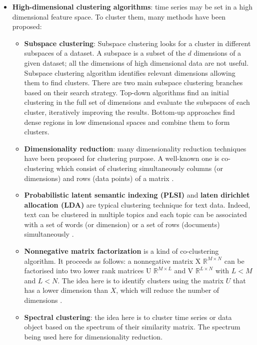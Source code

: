 \begin{itemize}
\item  \textbf{High-dimensional clustering algorithms}: time series may be set in a high dimensional feature space. To cluster them, many methods have been proposed:

\begin{itemize}
	\item  \textbf{Subspace clustering}: Subspace clustering looks for a cluster in 	different subspaces of a dataset.  A subspace is a subset of the $d$ dimensions 		of a given dataset; all the dimensions of high dimensional data are not useful. 	Subspace clustering algorithm identifies relevant dimensions allowing them to 		find clusters. There are two main subspace clustering branches based on their 		search strategy. Top-down algorithms find an initial clustering in the full set 		of dimensions and evaluate the subspaces of each cluster, iteratively improving 	the results. Bottom-up approaches find dense regions in low dimensional spaces 		and combine them to form clusters\cite{parsons2004subspace}.
	\item \textbf{Dimensionality reduction}: many dimensionality reduction 				techniques have been proposed for clustering purpose. A well-known one is co-clustering which consist of clustering simultaneously columns (or dimensions) 	and	rows (data points) of a matrix \cite{dhillon2003information}.
	\item \textbf{Probabilistic latent semantic indexing (PLSI)} and \textbf{laten 		dirichlet allocation (LDA)}  are typical clustering technique for text data. Indeed, text can be clustered in multiple topics and  each topic can be associated with a 		set of words (or dimension) or a set of rows (documents) simultaneously 			\cite{hofmann2017probabilistic}.
	\item \textbf{Nonnegative matrix factorization} is a kind of co-clustering 			algorithm. It proceeds as follows: a nonnegative matrix X \in $\mathbb{R}^{M			\times N}$ can be 			factorised into two lower rank matrices U \in $			\mathbb{R}^{M\times L}$ and V \in $\mathbb{R}^{L\times N}$ with $L < M$ and $L 		< N$.  The idea here is to identify clusters using the matrix $U$ that has a lower 	dimension than $X$, which will reduce the number of dimensions 						\cite{wang2013nonnegative}.
	\item \textbf{Spectral clustering}: the idea here is to cluster time series or 		data object based on the spectrum of their similarity matrix. The spectrum 			being used here for dimensionality reduction\cite{filippone2008survey}.
	
\end{itemize}
 

\end{itemize}
